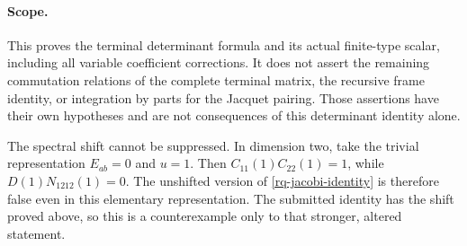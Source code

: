 \paragraph{Scope.}
This proves the terminal determinant formula and its
actual finite-type scalar, including all variable
coefficient corrections.  It does not assert the
remaining commutation relations of the complete
terminal matrix, the recursive frame identity, or
integration by parts for the Jacquet pairing.
Those assertions have their own hypotheses and are
not consequences of this determinant identity alone.

The spectral shift cannot be suppressed.  In dimension
two, take the trivial representation $E_{ab}=0$ and
$u=1$.  Then $C_{11}(1)C_{22}(1)=1$, while
$D(1)N_{1212}(1)=0$.  The unshifted version of
\eqref{rq-jacobi-identity} is therefore false even in
this elementary representation.  The submitted
identity has the shift proved above, so this is a
counterexample only to that stronger, altered statement.


